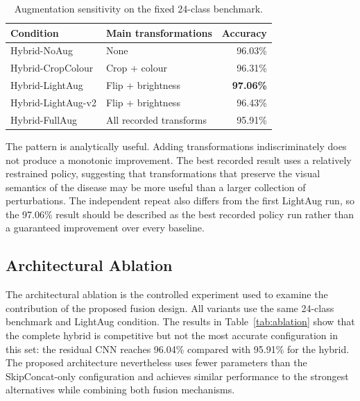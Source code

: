 \documentclass[a4paper,fleqn]{cas-dc}
\begin{document}
\begin{table}[!t]
\centering
\caption{Augmentation sensitivity on the fixed 24-class benchmark.}
\label{tab:augmentation}
\begin{tabular}{p{3.2cm}p{2.8cm}r}
\toprule
Condition & Main transformations & Accuracy \\
\midrule
Hybrid-NoAug & None & 96.03\% \\
Hybrid-CropColour & Crop + colour & 96.31\% \\
Hybrid-LightAug & Flip + brightness & \textbf{97.06\%} \\
Hybrid-LightAug-v2 & Flip + brightness & 96.43\% \\
Hybrid-FullAug & All recorded transforms & 95.91\% \\
\bottomrule
\end{tabular}
\end{table}

The pattern is analytically useful. Adding transformations indiscriminately does not produce a monotonic improvement. The best recorded result uses a relatively restrained policy, suggesting that transformations that preserve the visual semantics of the disease may be more useful than a larger collection of perturbations. The independent repeat also differs from the first LightAug run, so the 97.06\% result should be described as the best recorded policy run rather than a guaranteed improvement over every baseline.

\subsection{Architectural Ablation}
The architectural ablation is the controlled experiment used to examine the contribution of the proposed fusion design. All variants use the same 24-class benchmark and LightAug condition. The results in Table~\ref{tab:ablation} show that the complete hybrid is competitive but not the most accurate configuration in this set: the residual CNN reaches 96.04\% compared with 95.91\% for the hybrid. The proposed architecture nevertheless uses fewer parameters than the SkipConcat-only configuration and achieves similar performance to the strongest alternatives while combining both fusion mechanisms.
\end{document}
